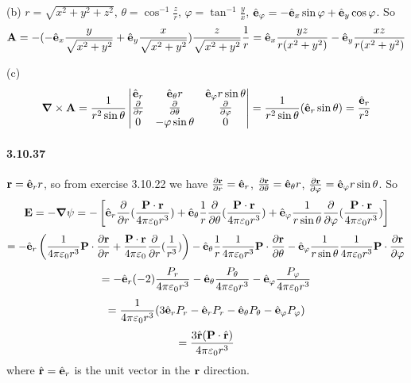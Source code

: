 \documentclass[a4paper]{article}
\begin{document}
(b) $r=\sqrt{x^2+y^2+z^2}$, $\theta=\cos^{-1}\frac{z}{r}$, $\varphi=\tan^{-1}\frac{y}{x}$, $\hat{\mathbf{e}}_\varphi=-\hat{\mathbf{e}}_x\sin\varphi+\hat{\mathbf{e}}_y\cos\varphi$. So
\[
\mathbf{A}=-(-\hat{\mathbf{e}}_x\frac{y}{\sqrt{x^2+y^2}}+\hat{\mathbf{e}}_y\frac{x}{\sqrt{x^2+y^2}})\frac{z}{\sqrt{x^2+y^2}}\frac{1}{r}=\hat{\mathbf{e}}_x\frac{yz}{r(x^2+y^2)}-\hat{\mathbf{e}}_y\frac{xz}{r(x^2+y^2)}
\]

(c)
\[
\boldsymbol{\nabla}\times\mathbf{A}=\frac{1}{r^2\sin\theta}
\begin{vmatrix}
\hat{\mathbf{e}}_r&\hat{\mathbf{e}}_\theta r&\hat{\mathbf{e}}_\varphi r\sin\theta\\
\frac{\partial}{\partial r}&\frac{\partial}{\partial\theta}&\frac{\partial}{\partial\varphi}\\
0&-\varphi\sin\theta&0
\end{vmatrix}
=\frac{1}{r^2\sin\theta}(\hat{\mathbf{e}}_r\sin\theta)=\frac{\hat{\mathbf{e}}_r}{r^2}
\]

\paragraph{3.10.37}
$\mathbf{r}=\hat{\mathbf{e}}_r r$, so from exercise 3.10.22 we have $\frac{\partial\mathbf{r}}{\partial r}=\hat{\mathbf{e}}_r$, $\frac{\partial\mathbf{r}}{\partial\theta}=\hat{\mathbf{e}}_\theta r$, $\frac{\partial\mathbf{r}}{\partial\varphi}=\hat{\mathbf{e}}_\varphi r\sin\theta$. So
\[
\mathbf{E}=-\boldsymbol{\nabla}\psi=-\left[\hat{\mathbf{e}}_r\frac{\partial}{\partial r}(\frac{\mathbf{P}\cdot\mathbf{r}}{4\pi\varepsilon_0r^3})+\hat{\mathbf{e}}_\theta\frac{1}{r}\frac{\partial}{\partial\theta}(\frac{\mathbf{P}\cdot\mathbf{r}}{4\pi\varepsilon_0r^3})+\hat{\mathbf{e}}_\varphi\frac{1}{r\sin\theta}\frac{\partial}{\partial\varphi}(\frac{\mathbf{P}\cdot\mathbf{r}}{4\pi\varepsilon_0r^3}) \right]
\]
\[
=-\hat{\mathbf{e}}_r\left(\frac{1}{4\pi\varepsilon_0r^3}\mathbf{P}\cdot\frac{\partial\mathbf{r}}{\partial r}+\frac{\mathbf{P}\cdot\mathbf{r}}{4\pi\varepsilon_0}\frac{\partial}{\partial r}(\frac{1}{r^3})\right)-\hat{\mathbf{e}}_\theta\frac{1}{r}\frac{1}{4\pi\varepsilon_0r^3}\mathbf{P}\cdot\frac{\partial\mathbf{r}}{\partial\theta}-\hat{\mathbf{e}}_\varphi\frac{1}{r\sin\theta}\frac{1}{4\pi\varepsilon_0r^3}\mathbf{P}\cdot\frac{\partial\mathbf{r}}{\partial\varphi}
\]
\[
=-\hat{\mathbf{e}}_r(-2)\frac{P_r}{4\pi\varepsilon_0r^3}-\hat{\mathbf{e}}_\theta\frac{P_\theta}{4\pi\varepsilon_0r^3}-\hat{\mathbf{e}}_\varphi\frac{P_\varphi}{4\pi\varepsilon_0r^3}
\]
\[
=\frac{1}{4\pi\varepsilon_0r^3}(3\hat{\mathbf{e}}_rP_r-\hat{\mathbf{e}}_rP_r-\hat{\mathbf{e}}_\theta P_\theta-\hat{\mathbf{e}}_\varphi P_\varphi)
\]
\[
=\frac{3\hat{\mathbf{r}}(\mathbf{P}\cdot\hat{\mathbf{r}})}{4\pi\varepsilon_0r^3}
\]
where $\hat{\mathbf{r}}=\hat{\mathbf{e}}_r$ is the unit vector in the $\mathbf{r}$ direction.
\end{document}
